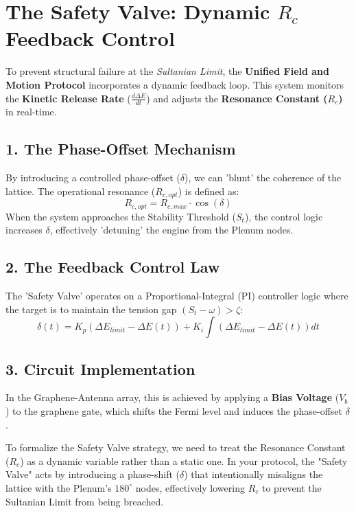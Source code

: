 \documentclass[11pt]{article}
\begin{document}
\section*{The Safety Valve: Dynamic $R_c$ Feedback Control}

To prevent structural failure at the \textit{Sultanian Limit}, the \textbf{Unified Field and Motion Protocol} incorporates a dynamic feedback loop. This system monitors the \textbf{Kinetic Release Rate} ($\frac{d\Delta E}{dt}$) and adjusts the \textbf{Resonance Constant ($R_c$)} in real-time.

\subsection*{1. The Phase-Offset Mechanism}
By introducing a controlled phase-offset ($\delta$), we can 'blunt' the coherence of the lattice. The operational resonance ($R_{c,opt}$) is defined as:
\begin{equation}
    R_{c,opt} = R_{c,max} \cdot \cos(\delta)
\end{equation}
When the system approaches the Stability Threshold ($S_t$), the control logic increases $\delta$, effectively 'detuning' the engine from the Plenum nodes.

\subsection*{2. The Feedback Control Law}
The 'Safety Valve' operates on a Proportional-Integral (PI) controller logic where the target is to maintain the tension gap $(S_t - \omega) > \zeta$:
\begin{equation}
    \delta(t) = K_p \left( \Delta E_{limit} - \Delta E(t) \right) + K_i \int (\Delta E_{limit} - \Delta E(t)) dt
\end{equation}

\subsection*{3. Circuit Implementation}
In the Graphene-Antenna array, this is achieved by applying a \textbf{Bias Voltage} ($V_b$) to the graphene gate, which shifts the Fermi level and induces the phase-offset $\delta$.


To formalize the Safety Valve strategy, we need to treat the Resonance Constant ($R_c$) as a dynamic variable rather than a static one. In your protocol, the "Safety Valve" acts by introducing a phase-shift ($\delta$) that intentionally misaligns the lattice with the Plenum's $180^\circ$ nodes, effectively lowering $R_c$ to prevent the Sultanian Limit from being breached.
\end{document}
